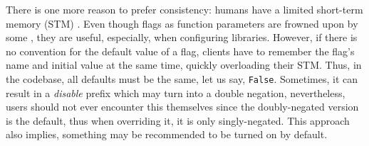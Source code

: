 There is one more reason to prefer consistency: humans have a limited short-term memory (STM) \cite{miller1956magical}. Even though flags as function parameters are frowned upon by some \cite{martin2009clean}, they are useful, especially, when configuring libraries. However, if there is no convention for the default value of a flag, clients have to remember the flag's name and initial value at the same time, quickly overloading their STM. Thus, in the codebase, all defaults must be the same, let us say, \texttt{False}. Sometimes, it can result in a \textit{disable} prefix which may turn into a double negation, nevertheless, users should not ever encounter this themselves since the doubly-negated version is the default, thus when overriding it, it is only singly-negated. This approach also implies, something may be recommended to be turned on by default.
